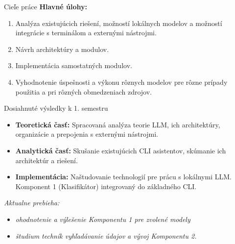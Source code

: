 \documentclass[10pt]{beamer}
\begin{document}
\begin{frame}{Cieľe práce}
    \textbf{Hlavné úlohy:}
    \begin{enumerate}
        \item Analýza existujúcich riešení, možností lokálnych modelov a možností integrácie s terminálom a externými nástrojmi.
        \item Návrh architektúry a modulov.
        \item Implementácia samostatných modulov.
        \item Vyhodnotenie úspešnosti a výkonu rôznych modelov pre rôzne prípady použitia a pri rôzných obmedzeniach zdrojov.
    \end{enumerate}
\end{frame}

\begin{frame}{Dosiahnuté výsledky k 1. semestru}
    \begin{itemize}
        \item[\checkmark] \textbf{Teoretická časť:} Spracovaná analýza teorie LLM, ich architektúry, organizácie a prepojenia s externými nástrojmi.
        \item[\checkmark] \textbf{Analytická časť:} Skušanie existujúcich CLI asistentov, skúmanie ich architektúr a riešení.
        \item[\checkmark] \textbf{Implementácia:} Naštudovanie technologií pre prácu s lokálnymi LLM.
        Komponent 1 (Klasifikátor) integrovaný do základného CLI.
    \end{itemize}
    \vspace{0.4cm}
    \begin{center}
        \textit{Aktualne prebieha:}
    \end{center}
    \begin{itemize}
        \item \textit{ ohodnotenie a výlešenie Komponentu 1 pre zvolené modely}
        \item \textit{ študium techník vyhľadávanie údajov a vývoj Komponentu 2.}
    \end{itemize}
\end{frame}
\end{document}
